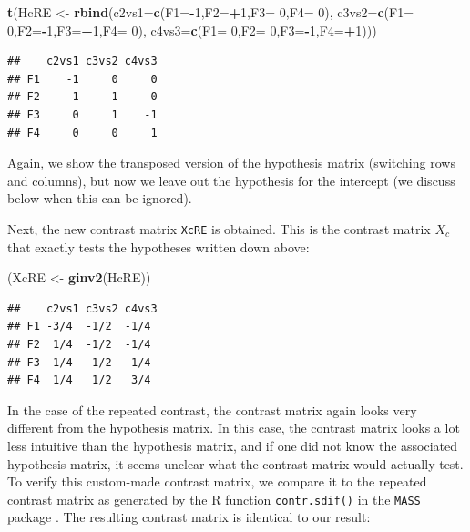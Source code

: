 \documentclass[12pt,]{krantz}
\newenvironment{Shaded}{\begin{snugshade}}{\end{snugshade}}
\newcommand{\DataTypeTok}[1]{\textcolor[rgb]{0.13,0.29,0.53}{#1}}
\newcommand{\DecValTok}[1]{\textcolor[rgb]{0.00,0.00,0.81}{#1}}
\newcommand{\KeywordTok}[1]{\textcolor[rgb]{0.13,0.29,0.53}{\textbf{#1}}}
\newcommand{\NormalTok}[1]{#1}
\newcommand{\OperatorTok}[1]{\textcolor[rgb]{0.81,0.36,0.00}{\textbf{#1}}}
\newcommand{\StringTok}[1]{\textcolor[rgb]{0.31,0.60,0.02}{#1}}
\theoremstyle{definition}
\theoremstyle{definition}
\theoremstyle{definition}
\theoremstyle{remark}
\begin{document}
\begin{Shaded}
\begin{Highlighting}[]
\KeywordTok{t}\NormalTok{(HcRE <-}\StringTok{ }\KeywordTok{rbind}\NormalTok{(}\DataTypeTok{c2vs1=}\KeywordTok{c}\NormalTok{(}\DataTypeTok{F1=}\OperatorTok{-}\DecValTok{1}\NormalTok{,}\DataTypeTok{F2=}\OperatorTok{+}\DecValTok{1}\NormalTok{,}\DataTypeTok{F3=} \DecValTok{0}\NormalTok{,}\DataTypeTok{F4=} \DecValTok{0}\NormalTok{),}
                \DataTypeTok{c3vs2=}\KeywordTok{c}\NormalTok{(}\DataTypeTok{F1=} \DecValTok{0}\NormalTok{,}\DataTypeTok{F2=}\OperatorTok{-}\DecValTok{1}\NormalTok{,}\DataTypeTok{F3=}\OperatorTok{+}\DecValTok{1}\NormalTok{,}\DataTypeTok{F4=} \DecValTok{0}\NormalTok{),}
                \DataTypeTok{c4vs3=}\KeywordTok{c}\NormalTok{(}\DataTypeTok{F1=} \DecValTok{0}\NormalTok{,}\DataTypeTok{F2=} \DecValTok{0}\NormalTok{,}\DataTypeTok{F3=}\OperatorTok{-}\DecValTok{1}\NormalTok{,}\DataTypeTok{F4=}\OperatorTok{+}\DecValTok{1}\NormalTok{)))}
\end{Highlighting}
\end{Shaded}

\begin{verbatim}
##    c2vs1 c3vs2 c4vs3
## F1    -1     0     0
## F2     1    -1     0
## F3     0     1    -1
## F4     0     0     1
\end{verbatim}

Again, we show the transposed version of the hypothesis matrix (switching rows and columns), but now we leave out the hypothesis for the intercept (we discuss below when this can be ignored).

Next, the new contrast matrix \texttt{XcRE} is obtained. This is the contrast matrix \(X_c\) that exactly tests the hypotheses written down above:

\begin{Shaded}
\begin{Highlighting}[]
\NormalTok{(XcRE <-}\StringTok{ }\KeywordTok{ginv2}\NormalTok{(HcRE))}
\end{Highlighting}
\end{Shaded}

\begin{verbatim}
##    c2vs1 c3vs2 c4vs3
## F1 -3/4  -1/2  -1/4 
## F2  1/4  -1/2  -1/4 
## F3  1/4   1/2  -1/4 
## F4  1/4   1/2   3/4
\end{verbatim}

In the case of the repeated contrast, the contrast matrix again looks very different from the hypothesis matrix. In this case, the contrast matrix looks a lot less intuitive than the hypothesis matrix, and if one did not know the associated hypothesis matrix, it seems unclear what the contrast matrix would actually test. To verify this custom-made contrast matrix, we compare it to the repeated contrast matrix as generated by the R function \texttt{contr.sdif()} in the \texttt{MASS} package \citep{R-MASS}. The resulting contrast matrix is identical to our result:
\end{document}
